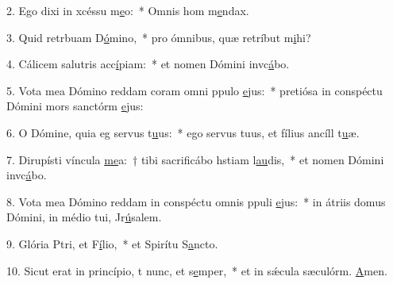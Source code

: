 2. Ego dixi in xcéssu m\uline{e}o:~* Omnis hom m\uline{e}ndax.\par 
3. Quid retrbuam D\uline{ó}mino,~* pro ómnibus, quæ retríbut m\uline{i}hi?\par 
4. Cálicem salutris acc\uline{í}piam:~* et nomen Dómini invc\uline{á}bo.\par 
5. Vota mea Dómino reddam coram omni ppulo \uline{e}jus:~* pretiósa in conspéctu Dómini mors sanctórm \uline{e}jus:\par 
6. O Dómine, quia eg servus t\uline{u}us:~* ego servus tuus, et fílius ancíll t\uline{u}æ.\par 
7. Dirupísti víncula \uline{me}a:~† tibi sacrificábo hstiam l\uline{au}dis,~* et nomen Dómini invc\uline{á}bo.\par 
8. Vota mea Dómino reddam in conspéctu omnis ppuli \uline{e}jus:~* in átriis domus Dómini, in médio tui, Jr\uline{ú}salem.\par 
9. Glória Ptri, et F\uline{í}lio,~* et Spirítu S\uline{a}ncto.\par 
10. Sicut erat in princípio, t nunc, et s\uline{e}mper,~* et in sǽcula sæculórm. \uline{A}men.\par 
